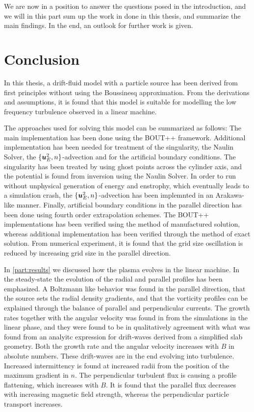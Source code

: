 %
We are now in a position to answer the questions posed in the introduction, and we will in this part sum up the work in done in this thesis, and summarize the main findings.
In the end, an outlook for further work is given.

\section*{Conclusion}
%
In this thesis, a drift-fluid model with a particle source has been derived from first principles without using the Boussinesq approximation.
From the derivations and assumptions, it is found that this model is suitable for modelling the low frequency turbulence observed in a linear machine.

The approaches used for solving this model can be summarized as follows:
The main implementation has been done using the BOUT++ framework.
Additional implementation has been needed for treatment of the singularity, the Naulin Solver, the $\{\boldsymbol{u}_E^2,n\}$-advection and for the artificial boundary conditions.
The singularity has been treated by using ghost points across the cylinder axis, and the potential is found from inversion using the Naulin Solver.
In order to run without unphysical generation of energy and enstrophy, which eventually leads to a simulation crash, the $\{\boldsymbol{u}_E^2,n\}$-advection has been implemnted in an Arakawa-like manner.
Finally, artificial boundary conditions in the parallel direction has been done using fourth order extrapolation schemes.
The BOUT++ implementations has been verified using the method of manufactured solution, whereas additional implementation has been verified through the method of exact solution.
From numerical experiment, it is found that the grid size oscillation is reduced by increasing grid size in the parallel direction.

In \cref{part:results} we discussed how the plasma evolves in the linear machine.
In the steady-state the evolution of the radial and parallel profiles has been emphasized.
A Boltzmann like behavior was found in the parallel direction, that the source sets the radial density gradients, and that the vorticity profiles can be explained through the balance of parallel and perpendicular currents.
The growth rates together with the angular velocity was found in from the simulations in the linear phase, and they were found to be in qualitatively agreement with what was found from an analyitc expression for drift-waves derived from a simplified slab geometry.
Both the growth rate and the angular velocity increases with $B$ in absolute numbers.
These drift-waves are in the end evolving into turbulence.
Increased intermittency is found at increased radii from the position of the maximum gradient in $n$.
The perpendicular turbulent flux is causing a profile flattening, which increases with $B$.
It is found that the parallel flux decreases with increasing magnetic field strength, whereas the perpendicular particle transport increases.

